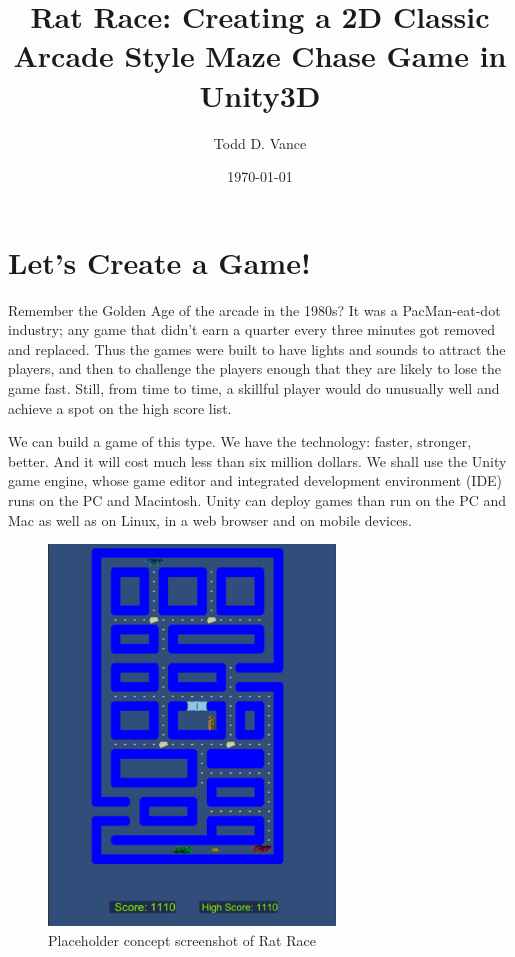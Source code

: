 \documentclass[12pt]{amsbook}
\title{Rat Race: Creating a 2D Classic Arcade Style Maze Chase Game in Unity3D}
\author{Todd D. Vance}
\date{\today}
\theoremstyle{definition}
\theoremstyle{remark}
\numberwithin{figure}{chapter}
\numberwithin{table}{chapter}
\numberwithin{section}{chapter}
\numberwithin{equation}{section}
\begin{document}
\frontmatter
\begin{abstract}
\end{abstract}

\maketitle{}
\setcounter{page}{2}%
\setcounter{secnumdepth}{3}
\setcounter{tocdepth}{3}
\tableofcontents{}


\mainmatter

\chapter{Let's Create a Game!}
Remember the Golden Age of the arcade in the 1980s? It was a PacMan-eat-dot industry; any game that didn't earn a quarter every three minutes got removed and replaced.  Thus the games were built to have lights and sounds to attract the players, and then to challenge the players enough that they are likely to lose the game fast. Still, from time to time, a skillful player would do unusually well and achieve a spot on the high score list.

We can build a game of this type.  We have the technology: faster, stronger, better.  And it will cost much less than six million dollars.  We shall use the Unity game engine, whose game editor and integrated development environment (IDE) runs on the PC and Macintosh.  Unity can deploy games than run on the PC and Mac as well as on Linux, in a web browser and on mobile devices.


\begin{figure}[h]
  \includegraphics[width=3in]{ratrace.png}
  \caption{Placeholder concept screenshot of Rat Race}
  \label{fig:placeholder}
\end{figure}
\end{document}
